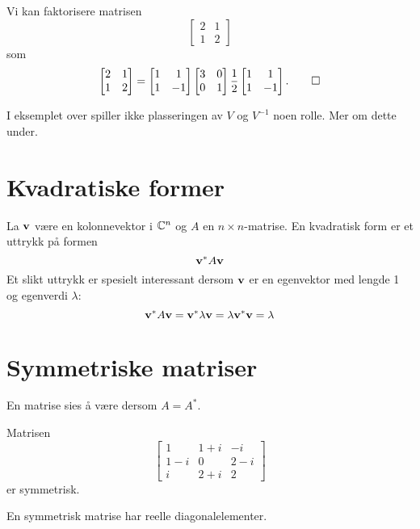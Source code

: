 \begin{ex}
Vi kan faktorisere matrisen 
\[
\begin{bmatrix}
2     & 1 \\
1      & 2
\end{bmatrix}
\]
som
\[
\begin{bmatrix}
2     & 1 \\
1      & 2
\end{bmatrix}
=
\begin{bmatrix}
1 & 1 \\ 1 &-1
\end{bmatrix}
\begin{bmatrix}
3     & 0 \\
0      & 1
\end{bmatrix}
\frac{1}{2}
\begin{bmatrix}
1 & 1 \\ 1 &-1
\end{bmatrix}.\qedhere
\]
\end{ex}
\begin{merkx}
I eksemplet over spiller ikke plasseringen av $V$ og $V^{-1}$ noen rolle. Mer om dette under.
\end{merkx}

\section*{Kvadratiske former}
La $\mathbf{v}$ være en kolonnevektor i $\mathbb{C}^n$ og $A$ en $n\times n$-matrise. En kvadratisk form er et uttrykk på formen 
\[
\mathbf{v}^* A \mathbf{v}
\]
Et slikt uttrykk er spesielt interessant dersom $\mathbf{v}$ er en egenvektor med lengde 1 og egenverdi $\lambda$:
\[
\mathbf{v}^* A \mathbf{v}=\mathbf{v}^* \lambda \mathbf{v}=\lambda \mathbf{v}^* \mathbf{v}=\lambda
\]



\section*{Symmetriske matriser}
En matrise sies å være 
 dersom $A=A^*$.

\begin{ex}
Matrisen
\[
\begin{bmatrix}
1 & 1+i & -i\\  1-i &0 & 2-i \\ i & 2+i  & 2
\end{bmatrix}
\]
er symmetrisk.
\end{ex}

\begin{merkx}
En symmetrisk matrise har reelle diagonalelementer.
\end{merkx}

